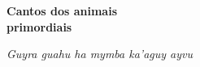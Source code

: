 


\begingroup\thispagestyle{empty}\vspace*{.05\textheight} 

              \formular
              \Huge
              \noindent
              \textbf{Cantos dos animais\\primordiais}
              
              \vspace{0.3em}

              \noindent\large\textit{Guyra guahu ha mymba ka’aguy ayvu}
                    
\endgroup
\vfill
\pagebreak